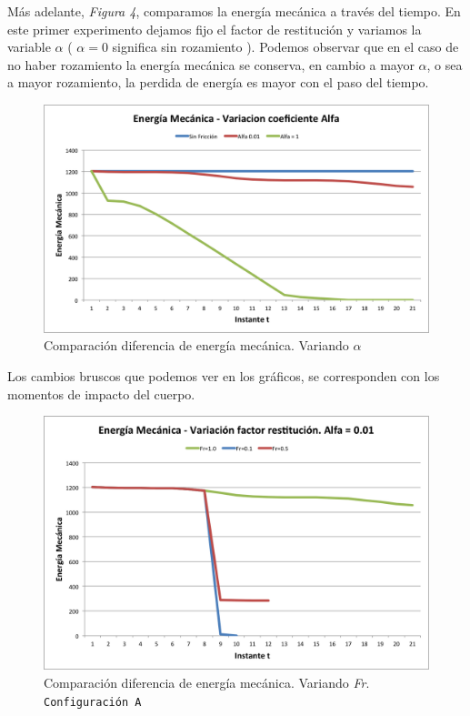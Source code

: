 \documentclass[a4paper]{article}
\begin{document}
	
Más adelante, \textit{Figura 4}, comparamos la energía mecánica a través del tiempo. En este primer experimento dejamos fijo el factor de restitución y variamos la variable $\alpha$  ( $\alpha = 0$ significa sin rozamiento ). Podemos observar que en el caso de no haber rozamiento la energía mecánica se conserva, en cambio a mayor $\alpha$, o sea a mayor rozamiento, la perdida de energía es mayor con el paso del tiempo. \\

\begin{figure}[H]
  \centering
  \includegraphics[scale=0.75]{graficos/4-energiaMecanica-alpha.png}
  \caption{Comparación diferencia de energía mecánica. Variando $\alpha$ }
\end{figure}

Los cambios bruscos que podemos ver en los gráficos, se corresponden con los momentos de impacto del cuerpo.

\begin{figure}[H]
  \centering
  \includegraphics[scale=0.75]{graficos/5-energiaMecanica-fr.png}
  \caption{Comparación diferencia de energía mecánica. Variando \textit{Fr}. \texttt{Configuración A} }
\end{figure}
 	
\end{document}
